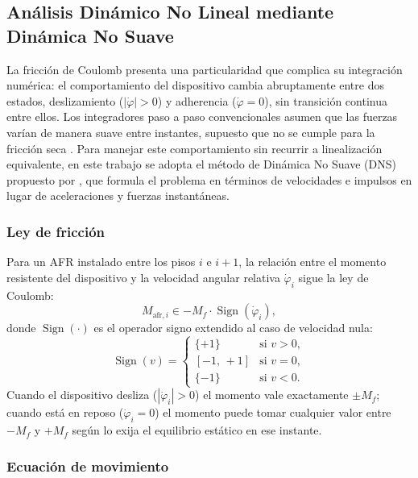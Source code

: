 \documentclass[preprint,12pt,authoryear]{elsarticle}
\newcommand{\Mf}{M_{\!f}}
\begin{document}
\subsection{Análisis Dinámico No Lineal mediante Dinámica No Suave}
\label{sec:theory:dns}

La fricción de Coulomb presenta una particularidad que complica su integración
numérica: el comportamiento del dispositivo cambia abruptamente entre dos
estados, deslizamiento ($|\dot{\varphi}|>0$) y adherencia ($\dot{\varphi}=0$),
sin transición continua entre ellos. Los integradores paso a paso convencionales
asumen que las fuerzas varían de manera suave entre instantes, supuesto que no
se cumple para la fricción seca \citep{chopra_dynamics_2015}. Para manejar este comportamiento sin recurrir
a linealización equivalente, en este trabajo se adopta el método de Dinámica
No Suave (DNS) propuesto por \citet{Namorado2024}, que formula el problema en
términos de velocidades e impulsos en lugar de aceleraciones y fuerzas
instantáneas.

\subsubsection*{Ley de fricción}

Para un AFR instalado entre los pisos $i$ e $i+1$, la relación entre el momento
resistente del dispositivo y la velocidad angular relativa $\dot{\varphi}_i$
sigue la ley de Coulomb:
\begin{equation}
    M_{\mathrm{afr},i} \in -\Mf \cdot \operatorname{Sign}\!\left(\dot{\varphi}_i\right),
    \label{eq:coulomb}
\end{equation}
donde $\operatorname{Sign}(\cdot)$ es el operador signo extendido al caso de
velocidad nula:
\begin{equation}
    \operatorname{Sign}(v) =
    \begin{cases}
        \{+1\}    & \text{si } v > 0, \\
        [-1,\,+1] & \text{si } v = 0, \\
        \{-1\}    & \text{si } v < 0.
    \end{cases}
    \label{eq:sign}
\end{equation}
Cuando el dispositivo desliza ($|\dot{\varphi}_i|>0$) el momento vale exactamente
$\pm\Mf$; cuando está en reposo ($\dot{\varphi}_i=0$) el momento puede tomar
cualquier valor entre $-\Mf$ y $+\Mf$ según lo exija el equilibrio estático
en ese instante.

\subsubsection*{Ecuación de movimiento}
\end{document}
